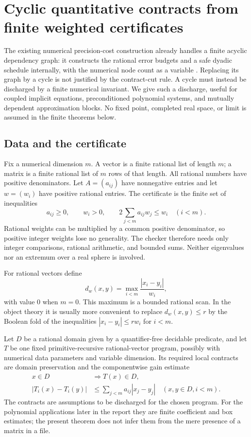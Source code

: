 \section{Cyclic quantitative contracts from finite weighted certificates}
\label{sec:feedback}

The existing numerical precision-cost construction already handles a finite
acyclic dependency graph: it constructs the rational error budgets and a safe
dyadic schedule internally, with the numerical node count as a variable
\cite{repo-dag}. Replacing its graph by a cycle is not justified by the
contract-cut rule. A cycle must instead be discharged by a finite numerical
invariant. We give such a discharge, useful for coupled implicit equations,
preconditioned polynomial systems, and mutually dependent approximation
blocks. No fixed point, completed real space, or limit is assumed in the finite
theorems below.

\subsection{Data and the certificate}

Fix a numerical dimension $m$. A vector is a finite rational list of length
$m$; a matrix is a finite rational list of $m$ rows of that length. All rational
numbers have positive denominators. Let $A=(a_{ij})$ have nonnegative entries
and let $w=(w_i)$ have positive rational entries. The certificate is the finite
set of inequalities
\begin{equation}\label{eq:half-certificate}
 a_{ij}\geq0,\qquad w_i>0,\qquad
 2\sum_{j<m} a_{ij}w_j\leq w_i\quad(i<m).
\end{equation}
Rational weights can be multiplied by a common positive denominator, so
positive integer weights lose no generality. The checker therefore needs only
integer comparisons, rational arithmetic, and bounded sums. Neither
eigenvalues nor an extremum over a real sphere is involved.

For rational vectors define
\[
 d_w(x,y)=\max_{i<m}\frac{|x_i-y_i|}{w_i},
\]
with value $0$ when $m=0$. This maximum is a bounded rational scan. In the
object theory it is usually more convenient to replace $d_w(x,y)\leq r$ by
the Boolean fold of the inequalities $|x_i-y_i|\leq rw_i$ for $i<m$.

Let $D$ be a rational domain given by a quantifier-free decidable predicate,
and let $T$ be one fixed primitive-recursive rational-vector program, possibly
with numerical data parameters and variable dimension. Its required local
contracts are domain preservation and the componentwise gain estimate
\begin{align}
 x\in D&\Longrightarrow T(x)\in D,\label{eq:T-domain}\\
 |T_i(x)-T_i(y)|&\leq\sum_{j<m}a_{ij}|x_j-y_j|
 \quad(x,y\in D, i<m).\label{eq:T-gain}
\end{align}
The contracts are assumptions to be discharged for the chosen program.
For the polynomial applications later in the report they are finite
coefficient and box estimates; the present theorem does not infer them from
the mere presence of a matrix in a file.

